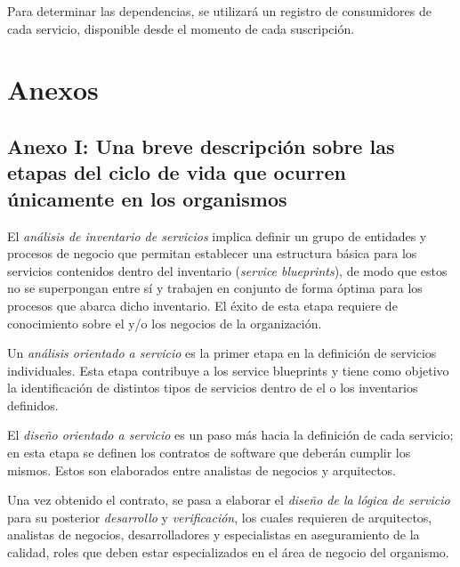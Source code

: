 \documentclass[11pt]{article}
\begin{document}
				Para determinar las dependencias, se utilizará un registro de consumidores de cada servicio, disponible desde el momento de cada suscripción.


	\section{Anexos}
		\subsection{Anexo I: Una breve descripción sobre las etapas del ciclo de vida que ocurren únicamente en los organismos}
			\label{sec:anexo1}
			El \emph{análisis de inventario de servicios} implica definir un grupo de entidades y procesos de negocio que permitan establecer una estructura básica para los servicios contenidos dentro del inventario (\emph{service blueprints}), de modo que estos no se superpongan entre sí y trabajen en conjunto de forma óptima para los procesos que abarca dicho inventario. El éxito de esta etapa requiere de conocimiento sobre el y/o los negocios de la organización.

			Un \emph{análisis orientado a servicio} es la primer etapa en la definición de servicios individuales. Esta etapa contribuye a los service blueprints y tiene como objetivo la identificación de distintos tipos de servicios dentro de el o los inventarios definidos.

			El \emph{diseño orientado a servicio} es un paso más hacia la definición de cada servicio; en esta etapa se definen los contratos de software que deberán cumplir los mismos. Estos son elaborados entre analistas de negocios y arquitectos.

			Una vez obtenido el contrato, se pasa a elaborar el \emph{diseño de la lógica de servicio} para su posterior \emph{desarrollo} y \emph{verificación}, los cuales requieren de arquitectos, analistas de negocios, desarrolladores y especialistas en aseguramiento de la calidad, roles que deben estar especializados en el área de negocio del organismo.


	
	
\end{document}
